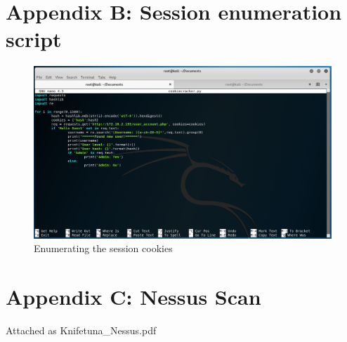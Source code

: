 \documentclass{report}
\begin{document}
\section{Appendix B: Session enumeration script}
\begin{figure}[!htb]
	\centering
	\includegraphics[scale=0.4]{img/cookiescript.png}
	\caption{Enumerating the session cookies}
\end{figure}
\section{Appendix C: Nessus Scan}
Attached as Knifetuna\_Nessus.pdf


\end{document}
